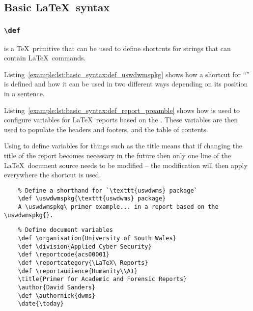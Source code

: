 \subsection{Basic \LaTeX\ syntax}
\subsubsection{\texttt{\textbackslash def}}
 is a \TeX\ primitive that can be used to define shortcuts for strings that can contain \LaTeX\ commands.

Listing~\ref{example:lst:basic_syntax:def_uswdwmspkg} shows how a shortcut for ``\uswdwmspkg{}'' is defined and how it can be used in two different ways depending on its position in a sentence. %

Listing~\ref{example:lst:basic_syntax:def_report_preamble} shows how  is used to configure variables for \LaTeX\ reports based on the \uswdwmspkg{}. These variables are then used to populate the headers and footers, and the table of contents.

Using  to define variables for things such as the title means that if changing the title of the report becomes necessary in the future then only one line of the \LaTeX\ document source needs to be modified -- the modification will then apply everywhere the shortcut is used.

\begin{listing}[H]
  \captionsetup{skip=\skiplistingcaptionlen}
  \begin{verbatim}
    % Define a shorthand for `\texttt{uswdwms} package`
    \def \uswdwmspkg{\texttt{uswdwms} package}
    A \uswdwmspkg\ primer example... in a report based on the \uswdwmspkg{}.
  \end{verbatim}
  \caption{\texttt{\textbackslash def \textbackslash uswdwmspkg} command example}
  \label{example:lst:basic_syntax:def_uswdwmspkg}
\end{listing}
\begin{listing}[H]
  \captionsetup{skip=\skiplistingcaptionlen}
  \begin{verbatim}
    % Define document variables
    \def \organisation{University of South Wales}
    \def \division{Applied Cyber Security}
    \def \reportcode{acs00001}
    \def \reportcategory{\LaTeX\ Reports}
    \def \reportaudience{Humanity\\AI}
    \title{Primer for Academic and Forensic Reports}
    \author{David Sanders}
    \def \authornick{dwms}
    \date{\today}
  \end{verbatim}
  \caption{\texttt{\textbackslash def} report preamble example}
  \label{example:lst:basic_syntax:def_report_preamble}
\end{listing}

